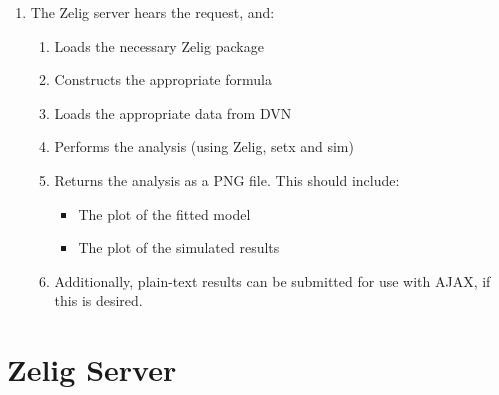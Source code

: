 \documentclass{article}
\begin{document}
\begin{enumerate}
  \item The Zelig server hears the request, and:
    \begin{enumerate}
      \item Loads the necessary Zelig package
      \item Constructs the appropriate formula
      \item Loads the appropriate data from DVN
      \item Performs the analysis (using Zelig, setx and sim)
      \item Returns the analysis as a PNG file. This should include:
        \begin{itemize}
          \item The plot of the fitted model
          \item The plot of the simulated results
        \end{itemize}
      \item Additionally, plain-text results can be submitted for use with
        AJAX, if this is desired.
    \end{enumerate}
\end{enumerate}


\section{Zelig Server}
\label{Zelig-Server}
\end{document}
